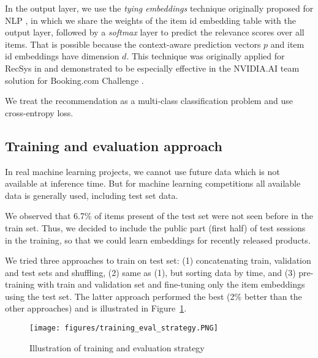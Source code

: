 \documentclass[sigconf,screen]{acmart}
\begin{document}
In the output layer, we use the \emph{tying embeddings} technique originally proposed for NLP \cite{inan2016tying,press2017using}, in which we share the weights of the item id embedding table with the output layer, followed by a \emph{softmax} layer to predict the relevance scores over all items. That is possible because the context-aware prediction vectors $p$ and item id embeddings have dimension $d$. This technique was originally applied for RecSys in \cite{hidasi2018recurrent} and demonstrated to be especially effective in the NVIDIA.AI team solution for Booking.com Challenge \cite{schifferer2021}.

We treat the recommendation as a multi-class classification problem and use cross-entropy loss. 





\vspace{-3.0mm}

\subsection{Training and evaluation approach}

In real machine learning projects, we cannot use future data which is not available at inference time. But for machine learning competitions all available data is generally used, including test set data.

We observed that 6.7\% of items present of the test set were not seen before in the train set. Thus, we decided to include the public part (first half) of test sessions in the training, so that we could learn embeddings for recently released products. 

We tried three approaches to train on test set: (1) concatenating train, validation and test sets and shuffling, (2) same as (1), but sorting data by time, and (3) pre-training with train and validation set and fine-tuning only the item embeddings using the test set. The latter approach performed the best (2\% better than the other approaches) and is illustrated in Figure~\ref{fig:train_eval_strategy}. 

\vspace{-4.0mm}

\begin{figure}[h]
  \centering
  \texttt{[image: figures/training\_eval\_strategy.PNG]}
  \caption{Illustration of training and evaluation strategy}
  \label{fig:train_eval_strategy}
\end{figure}
\end{document}
